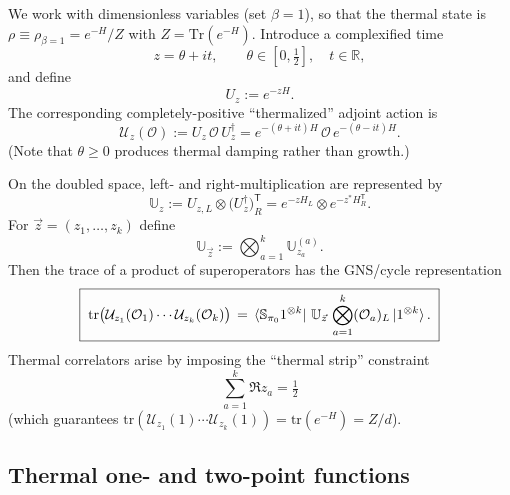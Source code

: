 \documentclass{article}
\theoremstyle{definition}
\newcommand{\mO}{\mathcal{O}}
\newcommand{\tr}{\text{tr}}
\begin{document}
    We work with dimensionless variables (set $\beta=1$), so that the thermal state
    is $\rho\equiv\rho_{\beta=1}=e^{-H}/Z$ with $Z=\mathrm{Tr}(e^{-H})$.
    Introduce a complexified time
    \begin{equation}
        z=\theta+i t,\qquad \theta\in[0,\tfrac12],\quad t\in\mathbb{R},
    \end{equation}
    and define
    \begin{equation}
        U_{z}:=e^{-zH}.
    \end{equation}
    The corresponding completely-positive ``thermalized'' adjoint action is
    \begin{equation}
        \boxed{\;\mathcal{U}_{z}(\mO):=U_{z}\,\mO\,U_{z}^{\dagger} =e^{-(\theta+i t)H}\,\mO\,e^{-(\theta-i t)H}.\;}
    \end{equation}
    (Note that $\theta\ge 0$ produces thermal damping rather than growth.)

    On the doubled space, left- and right-multiplication are represented by
    \begin{equation}
        \mathbb{U}_{z}:=U_{z,L}\otimes \big(U_{z}^{\dagger}\big)_{R}^{\mathsf{T}}
        =e^{-zH_L}\otimes e^{-z^{\ast} H_R^{\mathsf{T}}}.
    \end{equation}
    For $\vec z=(z_{1},\dots,z_{k})$ define
    \begin{equation}
        \mathbb{U}_{\vec z}:=\bigotimes_{a=1}^{k}\mathbb{U}_{z_a}^{(a)}.
    \end{equation}
    Then the trace of a product of superoperators has the GNS/cycle
    representation
    \begin{equation}
        \boxed{\; \tr\big(\mathcal{U}_{z_1}(\mO_1)\cdots \mathcal{U}_{z_k}(\mO_k)\big) \,=\,\bra{\mathbb{S}_{\pi_0}1^{\otimes k}}\,\mathbb{U}_{\vec z}\,\bigotimes_{a=1}^{k}(\mO_a)_{L}\ket{1^{\otimes k}}.\;}
    \end{equation}
    Thermal correlators arise by imposing the ``thermal strip'' constraint
    \begin{equation}
        \boxed{\;\sum_{a=1}^k \Re z_a=\tfrac12\;}
    \end{equation}
    (which guarantees $\tr(\mathcal{U}_{z_1}(1)\cdots \mathcal{U}_{z_k}(1))=\tr (
    e^{-H})=Z/d$).

    \subsection*{Thermal one- and two-point functions}
\end{document}
